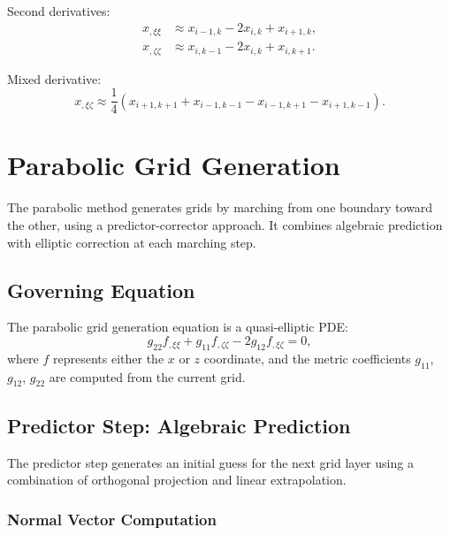 \documentclass[11pt,a4paper]{report}
\begin{document}
Second derivatives:
\begin{equation}
\begin{aligned}
    x_{,\xi\xi} &\approx x_{i-1,k} - 2x_{i,k} + x_{i+1,k}, \\
    x_{,\zeta\zeta} &\approx x_{i,k-1} - 2x_{i,k} + x_{i,k+1}.
\end{aligned}
\end{equation}

Mixed derivative:
\begin{equation}
    x_{,\xi\zeta} \approx \frac{1}{4}(x_{i+1,k+1} + x_{i-1,k-1} - x_{i-1,k+1} - x_{i+1,k-1}).
\end{equation}

\chapter{Parabolic Grid Generation}

The parabolic method generates grids by marching from one boundary toward the other, using a predictor-corrector approach. It combines algebraic prediction with elliptic correction at each marching step.

\section{Governing Equation}

The parabolic grid generation equation is a quasi-elliptic PDE:
\begin{equation}
    g_{22} f_{,\xi\xi} + g_{11} f_{,\zeta\zeta} - 2g_{12} f_{,\xi\zeta} = 0,
    \label{eq:para-gov}
\end{equation}
where $f$ represents either the $x$ or $z$ coordinate, and the metric coefficients $g_{11}$, $g_{12}$, $g_{22}$ are computed from the current grid.

\section{Predictor Step: Algebraic Prediction}

The predictor step generates an initial guess for the next grid layer using a combination of orthogonal projection and linear extrapolation.

\subsection{Normal Vector Computation}
\end{document}
